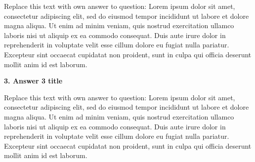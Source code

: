\documentclass[a4paper, 11pt]{article}
\begin{document}
Replace this text with own answer to question: Lorem ipsum dolor sit amet, consectetur adipiscing elit, sed do eiusmod tempor incididunt ut labore et dolore magna aliqua. Ut enim ad minim veniam, quis nostrud exercitation ullamco laboris nisi ut aliquip ex ea commodo consequat. Duis aute irure dolor in reprehenderit in voluptate velit esse cillum dolore eu fugiat nulla pariatur. Excepteur sint occaecat cupidatat non proident, sunt in culpa qui officia deserunt mollit anim id est laborum.


\vspace{1cm}  %
\textbf{3. Answer 3 title}  %

Replace this text with own answer to question: Lorem ipsum dolor sit amet, consectetur adipiscing elit, sed do eiusmod tempor incididunt ut labore et dolore magna aliqua. Ut enim ad minim veniam, quis nostrud exercitation ullamco laboris nisi ut aliquip ex ea commodo consequat. Duis aute irure dolor in reprehenderit in voluptate velit esse cillum dolore eu fugiat nulla pariatur. Excepteur sint occaecat cupidatat non proident, sunt in culpa qui officia deserunt mollit anim id est laborum.


\medskip
\printbibliography

\end{document}
